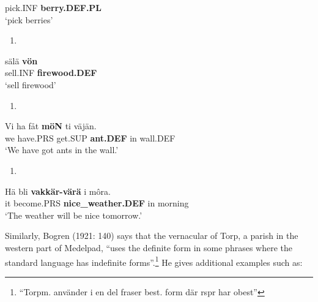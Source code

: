 pick.INF  \textbf{berry.DEF.PL}\\ %


‘pick berries’
\z


\begin{enumerate} %
\item 
\end{enumerate} %
\ea\label{}
\gll sälä  \textbf{vön} \\


sell.INF  \textbf{firewood.DEF} \\ %


‘sell firewood’
\z


\begin{enumerate} %
\item 
\end{enumerate} %
\ea\label{}
\gll Vi  ha  fåt  \textbf{möN} ti  väjän.  \\


we  have.PRS  get.SUP  \textbf{ant.DEF} in  wall.DEF  \\ %


‘We have got ants in the wall.’
\z


\begin{enumerate} %
\item 
\end{enumerate} %
\ea\label{}
\gll Hä  bli  \textbf{vakkär-värä} i  môra.\\


it  become.PRS  \textbf{nice\_weather.DEF} in  morning\\ %


‘The weather will be nice tomorrow.’
\z


Similarly, Bogren (1921: 140) says that the vernacular of Torp, a parish in the western part of Medelpad, “uses the definite form in some phrases where the standard language has indefinite forms”.\footnote{ “Torpm. använder i en del fraser best. form där rspr har obest”} He gives additional examples such as:

